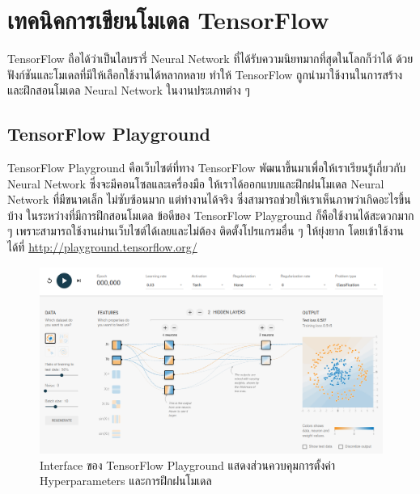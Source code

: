 

\section{เทคนิคการเขียนโมเดล TensorFlow}
\label{ap:coding_tf}

TensorFlow ถือได้ว่าเป็นไลบรารี่ Neural Network ที่ได้รับความนิยทมากที่สุดในโลกก็ว่าได้ ด้วยฟังก์ชันและโมเดลที่มีให้เลือกใช้งานได้หลากหลาย
ทำให้ TensorFlow ถูกนำมาใช้งานในการสร้างและฝึกสอนโมเดล Neural Network ในงานประเภทต่าง ๆ

\subsection{TensorFlow Playground}

TensorFlow Playground คือเว็บไซต์ที่ทาง TensorFlow พัฒนาขึ้นมาเพื่อให้เราเรียนรู้เกี่ยวกับ Neural Network ซึ่งจะมีคอนโซลและเครื่องมือ%
ให้เราได้ออกแบบและฝึกฝนโมเดล Neural Network ที่มีขนาดเล็ก ไม่ซับซ้อนมาก แต่ทำงานได้จริง ซึ่งสามารถช่วยให้เราเห็นภาพว่าเกิดอะไรขึ้นบ้าง%
ในระหว่างที่มีการฝึกสอนโมเดล ข้อดีของ TensorFlow Playground ก็คือใช้งานได้สะดวกมาก ๆ เพราะสามารถใช้งานผ่านเว็บไซต์ได้เลยและไม่ต้อง%
ติดตั้งโปรแกรมอื่น ๆ ให้ยุ่งยาก โดยเข้าใช้งานได้ที่ \url{http://playground.tensorflow.org/}

\begin{figure}[H]
    \centering
    \includegraphics[width=\linewidth]{fig/tf-playground.png}
    \caption{Interface ของ TensorFlow Playground แสดงส่วนควบคุมการตั้งค่า Hyperparameters และการฝึกฝนโมเดล}
    \label{fig:tf_playground}
\end{figure}

